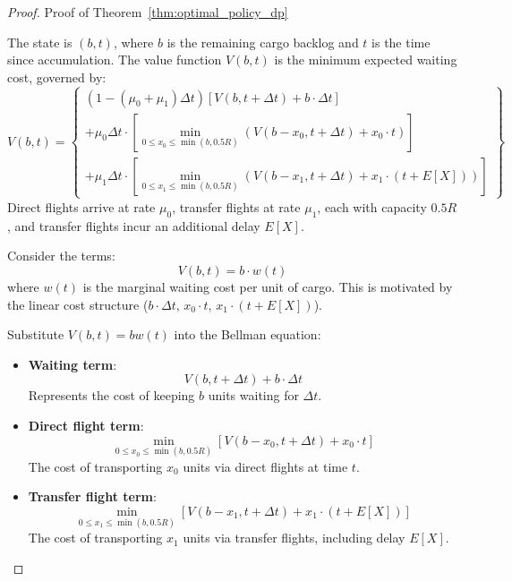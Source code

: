 \documentclass[opre,sglanonrev]{informs4}
\begin{document}
\begin{proof}{Proof of Theorem~\ref{thm:optimal_policy_dp}}

The state is \( (b, t) \), where \( b \) is the remaining cargo backlog and \( t \) is the time since accumulation. The value function \( V(b, t) \) is the minimum expected waiting cost, governed by:
\[
V(b, t) = \left\{
\begin{array}{l}
(1 - (\mu_0 + \mu_1) \Delta t) \left[ V(b, t + \Delta t) + b \cdot \Delta t \right] \\
+ \mu_0 \Delta t \cdot \left[ \min_{0 \leq x_0 \leq \min(b, 0.5R)} \left( V(b - x_0, t + \Delta t) + x_0 \cdot t \right) \right] \\
+ \mu_1 \Delta t \cdot \left[ \min_{0 \leq x_1 \leq \min(b, 0.5R)} \left( V(b - x_1, t + \Delta t) + x_1 \cdot (t + E[X]) \right) \right]
\end{array}
\right\}
\]
Direct flights arrive at rate \( \mu_0 \), transfer flights at rate \( \mu_1 \), each with capacity \( 0.5R \), and transfer flights incur an additional delay \( E[X] \).

Consider the terms:
\[
V(b, t) = b \cdot w(t)
\]
where \( w(t) \) is the marginal waiting cost per unit of cargo. This is motivated by the linear cost structure (\( b \cdot \Delta t \), \( x_0 \cdot t \), \( x_1 \cdot (t + E[X]) \)).

Substitute \( V(b, t) = b w(t) \) into the Bellman equation:
\begin{itemize}
    \item \textbf{Waiting term}:
    \[
    V(b, t + \Delta t) + b \cdot \Delta t
    \]
    Represents the cost of keeping \( b \) units waiting for \( \Delta t \).
    \item \textbf{Direct flight term}:
    \[
    \min_{0 \leq x_0 \leq \min(b, 0.5R)} \left[ V(b - x_0, t + \Delta t) + x_0 \cdot t \right]
    \]
    The cost of transporting \( x_0 \) units via direct flights at time \( t \).
    \item \textbf{Transfer flight term}:
    \[
    \min_{0 \leq x_1 \leq \min(b, 0.5R)} \left[ V(b - x_1, t + \Delta t) + x_1 \cdot (t + E[X]) \right]
    \]
    The cost of transporting \( x_1 \) units via transfer flights, including delay \( E[X] \).
\end{itemize}


\end{proof}
\end{document}

